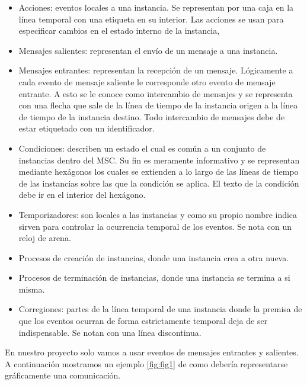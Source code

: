 \documentclass[12pt,a4paper]{report}
\begin{document}
\begin{itemize}
\item Acciones: eventos locales a una instancia. Se representan por una caja en la línea temporal con una etiqueta en su interior. Las acciones se usan para especificar cambios en el estado interno de la instancia,
\item Mensajes salientes: representan el envío de un mensaje a una instancia.
\item Mensajes entrantes: representan la recepción de un mensaje. Lógicamente a cada evento de mensaje saliente le corresponde otro evento de mensaje entrante. A esto se le conoce como intercambio de mensajes y se representa con una flecha que sale de la línea de tiempo de la instancia origen a la línea de tiempo de la instancia destino. Todo intercambio de mensajes debe de estar etiquetado con un identificador. 
\item Condiciones: describen un estado el cual es común a un conjunto de instancias dentro del MSC. Su fin es meramente informativo y se representan mediante hexágonos los cuales se extienden a lo largo de las líneas de tiempo de las instancias sobre las que la condición se aplica. El texto de la condición debe ir en el interior del hexágono.
\item Temporizadores: son locales a las instancias y como su propio nombre indica sirven para controlar la ocurrencia temporal de los eventos. Se nota con un reloj de arena.
\item Procesos de creación de instancias, donde una instancia crea a otra nueva.
\item Procesos de terminación de instancias, donde una instancia se termina a si misma.
\item Corregiones: partes de la línea temporal de una instancia donde la premisa de que los eventos ocurran de forma estrictamente temporal deja de ser indispensable. Se notan con una línea discontinua.
\end{itemize}

En nuestro proyecto solo vamos a usar eventos de mensajes entrantes y salientes. A continuación mostramos un ejemplo \ref{fig:fig1} de como debería representarse gráficamente una comunicación.
\end{document}

